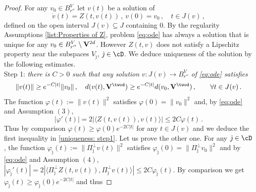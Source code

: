 \documentclass[11pt,a4paper,reqno]{article}
\numberwithin{equation}{section}
\theoremstyle{definition}
\begin{document}
\begin{appendix}
        \begin{proof}
           For any $v_0\in B_{r''}^V $  let $v(t)$ be a solution of 
            \begin{equation}\label{eq:ode}
                    \dot v(t)=Z(t,v(t)) \, ,  \ 
                    v(0)=v_0 \, , \quad 
                    t\in J(v) \, , 
            \end{equation}
            defined on the open interval $J(v)\subseteq J$ containing $0$. By the regularity Assumptions \eqref{list:Properties of Z}, 
           problem \eqref{eq:ode} has always a solution that is  unique for any $ v_0 \in  B_{r''}^V \setminus {\bf V}^{2d}$. 
           {However  $ Z (t, v) $ does not satisfy a Lipschitz property near the subspaces $  V_{\hat \jmath } $,  $ \hat \jmath \in \cD $.}  
           We  deduce 
           uniqueness of the solution  by the following estimates.  
            \\[1mm]
            {\sc Step 1:} {\it there is 
            $C >  0 $ such that any solution  
            $ v:J(v)\to B_{r''}^V$ of \eqref{eq:ode}  satisfies}
            \begin{equation}\label{uniqueness: step1}
                \|v(t)\|\geq e^{-C|t|} \|v_0\| \, , \quad  d(v(t),{\bf V}^{\twod})\geq e^{-C|t|} d(v_0,{\bf V}^{\twod}) \, ,  \qquad \forall  t\in J(v)\, .
            \end{equation}
            The function  $ \varphi(t) := \|v(t)\|^2$
            satisfies $\varphi(0) = {\| v_0 \|^2} $ and, by \eqref{eq:ode}  and Assumption ${(3)}$, 
    \begin{equation}\label{apriori}
       { |\varphi'(t)| =  
            2 |\langle Z(t,v(t)),v(t)\rangle |
            \leq 2 C  \varphi(t)} \, . 
    \end{equation}
        Thus by comparison  
        $           {\varphi(t) \geq  \varphi(0) e^{- 2 C |t|}} 
        $ for any $t \in J(v) $ and we deduce the first inequality in \eqref{uniqueness: step1}.  Let us prove the other one.       
        For any ${\hat \jmath}\in \cD $,  the function $
        \varphi_{\hat \jmath}(t) := \|\Pi_{\hat \jmath}^\bot v(t)\|^2$
        satisfies  $\varphi_{\hat \jmath}(0) {= \|\Pi_{\hat \jmath}^\bot v_0 \|^2 } $ and
        by \eqref{eq:ode}  and Assumption $ {(4)}$, 
        $
            |\varphi_{\hat \jmath}'(t)|= {2 |\langle \Pi_{\hat \jmath}^\bot Z(t,v(t)),\Pi_{\hat \jmath}^\bot v(t)\rangle |
            \leq 2 C  \varphi_{\hat \jmath}(t)}$. 
        By comparison we get  $ \varphi_{\hat \jmath}(t) \geq 
        \varphi_{\hat \jmath}(0) e^{-2C |t|}$ and thus 

\end{proof}
\end{appendix}
\end{document}

